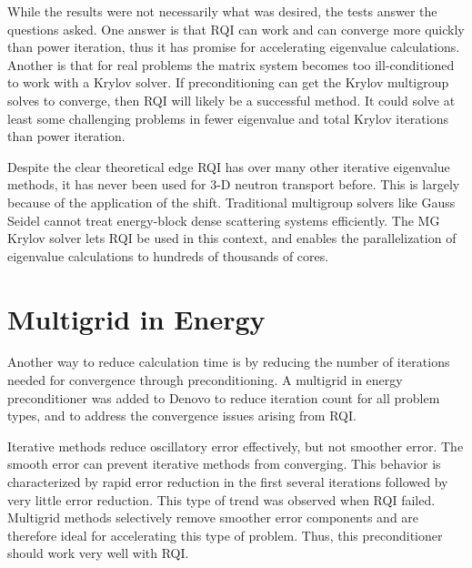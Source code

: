 While the results were not necessarily what was desired, the tests answer the questions asked. One answer is that RQI can work and can converge more quickly than power iteration, thus it has promise for accelerating eigenvalue calculations. Another is that for real problems the matrix system becomes too ill-conditioned to work with a Krylov solver. If preconditioning can get the Krylov multigroup solves to converge, then RQI will likely be a successful method. It could solve at least some challenging problems in fewer eigenvalue and total Krylov iterations than power iteration. 

Despite the clear theoretical edge RQI has over many other iterative eigenvalue methods, it has never been used for 3-D neutron transport before. This is largely because of the application of the shift. Traditional multigroup solvers like Gauss Seidel cannot treat energy-block dense scattering systems efficiently. The MG Krylov solver lets RQI be used in this context, and enables the parallelization of eigenvalue calculations to hundreds of thousands of cores. 

\section{Multigrid in Energy}
Another way to reduce calculation time is by reducing the number of iterations needed for convergence through preconditioning. %
A multigrid in energy preconditioner was added to Denovo to reduce iteration count for all problem types, and to address the convergence issues arising from RQI. 

Iterative methods reduce oscillatory error effectively, but not smoother error. The smooth error can prevent iterative methods from converging. This behavior is characterized by rapid error reduction in the first several iterations followed by very little error reduction. This type of trend was observed when RQI failed. Multigrid methods selectively remove smoother error components and are therefore ideal for accelerating this type of problem. Thus, this preconditioner should work very well with RQI. 


